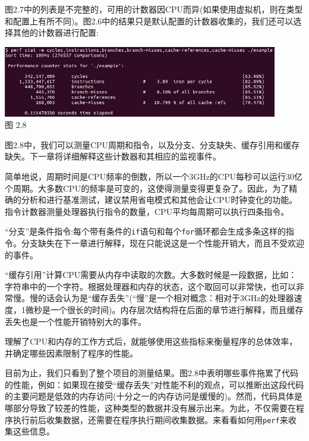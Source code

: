 图2.7中的列表是不完整的，可用的计数器因CPU而异(如果使用虚拟机，则在类型和配置上有所不同)。图2.6中的结果只是默认配置的计数器收集的，我们还可以选择其他的计数器进行配置:

\begin{center}
\includegraphics[width=0.9\textwidth]{content/1/chapter2/images/8.jpg}\\
图 2.8
\end{center}

图2.8中，我们可以测量CPU周期和指令，以及分支、分支缺失、缓存引用和缓存缺失。下一章将详细解释这些计数器和其相应的监视事件。

简单地说，周期时间是CPU频率的倒数，所以一个3GHz的CPU每秒可以运行30亿个周期。大多数CPU的频率是可变的，这使得测量变得更复杂了。因此，为了精确的分析和进行基准测试，建议禁用省电模式和其他会让CPU时钟变化的功能。指令计数器测量处理器执行指令的数量，CPU平均每周期可以执行四条指令。

“分支”是条件指令:每个带有条件的\texttt{if}语句和每个\texttt{for}循环都会生成多条这样的指令。分支缺失在下一章进行解释，现在只能说这是一个性能开销大，而且不受欢迎的事件。

“缓存引用”计算CPU需要从内存中读取的次数。大多数时候是一段数据，比如：字符串中的一个字符。根据处理器和内存的状态，这个取回可以非常快，也可以非常慢。慢的话会认为是“缓存丢失”(“慢”是一个相对概念：相对于3GHz的处理器速度，1微秒是一个很长的时间)。内存层次结构将在后面的章节进行解释，而且缓存丢失也是一个性能开销特别大的事件。

理解了CPU和内存的工作方式后，就能够使用这些指标来衡量程序的总体效率，并确定哪些因素限制了程序的性能。

目前为止，我们只看到了整个项目的测量结果。图2.8中表明哪些事件拖累了代码的性能，例如：如果现在接受“缓存丢失”对性能不利的观点，可以推断出这段代码的主要问题是低效的内存访问(十分之一的内存访问是缓慢的)。然而，代码具体是哪部分导致了较差的性能，这种类型的数据并没有展示出来。为此，不仅需要在程序执行前后收集数据，还需要在程序执行期间收集数据。来看看如何用\texttt{perf}来收集这些信息。


